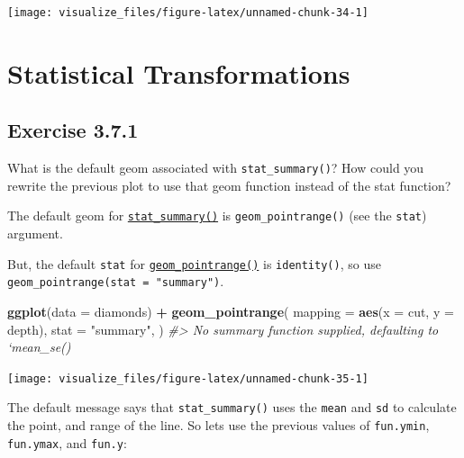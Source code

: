 \documentclass[]{book}
\newenvironment{Shaded}{\begin{snugshade}}{\end{snugshade}}
\newcommand{\CommentTok}[1]{\textcolor[rgb]{0.56,0.35,0.01}{\textit{#1}}}
\newcommand{\DataTypeTok}[1]{\textcolor[rgb]{0.13,0.29,0.53}{#1}}
\newcommand{\KeywordTok}[1]{\textcolor[rgb]{0.13,0.29,0.53}{\textbf{#1}}}
\newcommand{\NormalTok}[1]{#1}
\newcommand{\OperatorTok}[1]{\textcolor[rgb]{0.81,0.36,0.00}{\textbf{#1}}}
\newcommand{\StringTok}[1]{\textcolor[rgb]{0.31,0.60,0.02}{#1}}
\theoremstyle{plain}
\theoremstyle{remark}
\begin{document}
\begin{center}\texttt{[image: visualize\_files/figure-latex/unnamed-chunk-34-1]} \end{center}

\hypertarget{statistical-transformations}{%
\section{Statistical Transformations}\label{statistical-transformations}}

\hypertarget{exercise-3.7.1}{%
\subsection*{\texorpdfstring{Exercise {3.7.1}}{Exercise 3.7.1}}\label{exercise-3.7.1}}

What is the default geom associated with \texttt{stat\_summary()}? How could you rewrite the previous plot to use that geom function instead of the stat function?

The default geom for \href{https://ggplot2.tidyverse.org/reference/stat_summary.html}{\texttt{stat\_summary()}} is \texttt{geom\_pointrange()} (see the \texttt{stat}) argument.

But, the default \texttt{stat} for \href{https://ggplot2.tidyverse.org/reference/geom_linerange.html}{\texttt{geom\_pointrange()}} is \texttt{identity()}, so use \texttt{geom\_pointrange(stat\ =\ "summary")}.

\begin{Shaded}
\begin{Highlighting}[]
\KeywordTok{ggplot}\NormalTok{(}\DataTypeTok{data =}\NormalTok{ diamonds) }\OperatorTok{+}
\StringTok{  }\KeywordTok{geom_pointrange}\NormalTok{(}
    \DataTypeTok{mapping =} \KeywordTok{aes}\NormalTok{(}\DataTypeTok{x =}\NormalTok{ cut, }\DataTypeTok{y =}\NormalTok{ depth),}
    \DataTypeTok{stat =} \StringTok{"summary"}\NormalTok{,}
\NormalTok{  )}
\CommentTok{#> No summary function supplied, defaulting to `mean_se()}
\end{Highlighting}
\end{Shaded}

\begin{center}\texttt{[image: visualize\_files/figure-latex/unnamed-chunk-35-1]} \end{center}

The default message says that \texttt{stat\_summary()} uses the \texttt{mean} and \texttt{sd} to calculate the point, and range of the line. So lets use the previous values of \texttt{fun.ymin}, \texttt{fun.ymax}, and \texttt{fun.y}:
\end{document}
